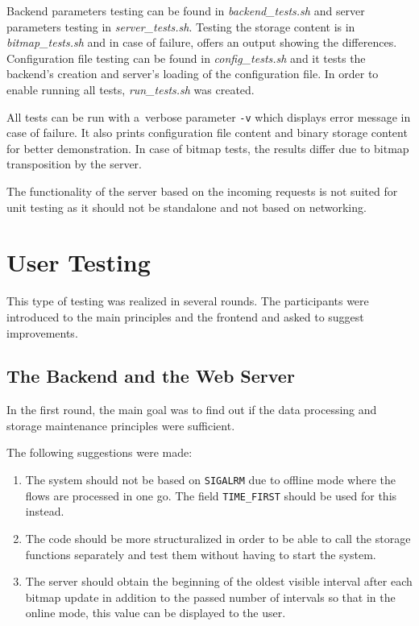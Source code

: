 Backend parameters testing can be found in \textit{backend\_tests.sh}
and server parameters testing in \textit{server\_tests.sh}. Testing
the storage content is in \textit{bitmap\_tests.sh} and in case of failure,
offers an output showing the differences. Configuration file testing
can be found in \textit{config\_tests.sh} and it tests the backend's
creation and server's loading of the configuration file.
In order to enable running all tests, \textit{run\_tests.sh} was created.

All tests can be run with a~verbose parameter \texttt{-v} which displays
error message in case of failure. It also prints configuration file
content and binary storage content for better demonstration. In case
of bitmap tests, the results differ due to bitmap transposition by the
server.

The functionality of the server based on the incoming requests is not
suited for unit testing as it should not be standalone and not based
on networking.

\section{User Testing}
This type of testing was realized in several rounds. The participants
were introduced to the main principles and the frontend and asked to suggest
improvements.

\subsection{The Backend and the Web Server}
In the first round, the main goal was to find out if the data processing
and storage maintenance principles were sufficient.

The following suggestions were made:

\begin{enumerate}
   \item The system should not be based on \texttt{SIGALRM} due to offline
   mode where the flows are processed in one go. The field \texttt{TIME\_FIRST}
   should be used for this instead.
   \item The code should be more structuralized in order to be able to
   call the storage functions separately and test them without having to
   start the system.
   \item The server should obtain the beginning of the oldest visible interval
   after each bitmap update in addition to the passed number of intervals so that
   in the online mode, this value can be displayed to the user.
\end{enumerate}


